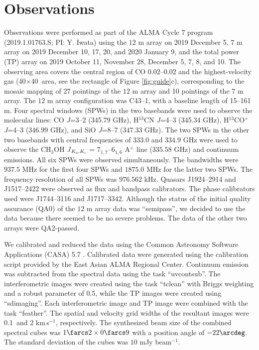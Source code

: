 \documentclass[twocolumn]{aastex631}
\newcommand\kms{\hbox{km$\,$s$^{-1}$}}
\begin{document}
\section{Observations} \label{sec:obs}
Observations were performed as part of the ALMA Cycle 7 program (2019.1.01763.S; PI: Y. Iwata) using the $12$ {\rm m} array on 2019 December 5, $7$ {\rm m} array on 2019 December 10, 17, 20, and 2020 January 9, and the total power (TP) array on 2019 October 11, November 28, December 5, 7, 8, and 10. The observing area covers the central region of CO 0.02--0.02 and the highest-velocity gas (40\arcsec$\times$40\arcsec\ area, see the rectangle of Figure \ref{fig:guide}c), corresponding to the mosaic mapping of 27 pointings of the $12$ {\rm m} array and 10 pointings of the $7$ {\rm m} array. The $12$ {\rm m} array configuration was C43--1, with a baseline length of 15--161 {\rm m}. Four spectral windows (SPWs) in the two basebands were used to observe the molecular lines: CO {\it J}=3--2 (345.79 {\rm GHz}), H$^{13}$CN {\it J}=4--3 (345.34 {\rm GHz}), H$^{13}$CO$^{+}$ {\it J}=4--3 ($346.99$ {\rm GHz}), and SiO {\it J}=8--7 ($347.33$ {\rm GHz}). The two SPWs in the other two basebands with central frequencies of 333.0 and $334.9$ {\rm GHz} were used to observe the CH$_3$OH {\it J}$_{\it K_a, K_c}$ = 7$_{1, 7}$--6$_{1,6}$ A$^{+}$ line ($335.58$ {\rm GHz}) and continuum emissions. All six SPWs were observed simultaneously. The bandwidths were $937.5$ {\rm MHz} for the first four SPWs and $1875.0$ {\rm MHz} for the latter two SPWs. The frequency resolution of all SPWs was $976.562$ {\rm kHz}. Quasars J1924--2914 and J1517--2422 were observed as flux and bandpass calibrators. The phase calibrators used were J1744--3116 and J1717--3342. Although the status of the initial quality assurance (QA0) of the $12$ {\rm m} array data was ``semipass'', we decided to use the data because there seemed to be no severe problems. The data of the other two arrays were QA2-passed. 

We calibrated and reduced the data using the Common Astronomy Software Applications (CASA) 5.7 \citep{McMullin07,CASA22}. Calibrated data were generated using the calibration script provided by the East Asian ALMA Regional Center. Continuum emission was subtracted from the spectral data using the task ``uvcontsub''. The interferometric images were created using the task ``tclean'' with Briggs weighting and a robust parameter of 0.5, while the TP images were created using ``sdimaging''. Each interferometric image and TP image were combined with the task ``feather''. The spatial and velocity grid widths of the resultant images were 0.1\arcsec\ and $2$ \kms, respectively. The synthesized beam size of the combined spectral cubes was $1\farcs2 \times 0\farcs9$ with a position angle of $-22\arcdeg$. The standard deviation of the cubes was $10$ {\rm mJy beam$^{-1}$}.
\end{document}
